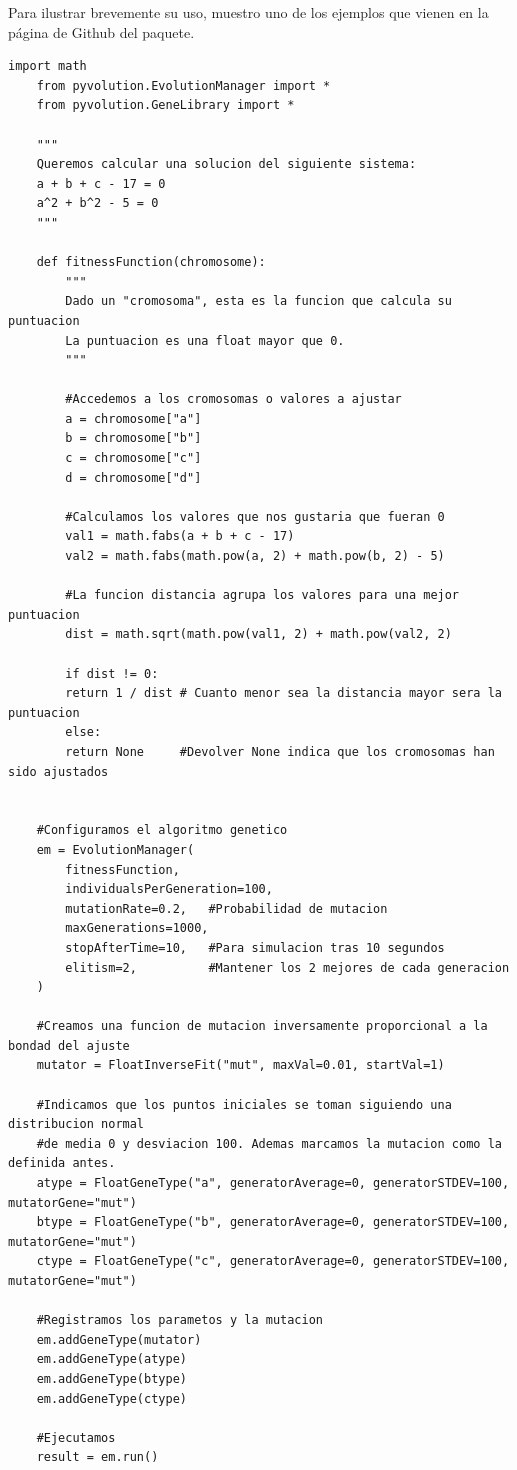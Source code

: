 \documentclass[12pt,a4paper]{article}
\begin{document}
		Para ilustrar brevemente su uso, muestro uno de los ejemplos que vienen en la p\'agina de Github del paquete.
		
		\begin{lstlisting}[basicstyle=\tiny]
	import math
	from pyvolution.EvolutionManager import *
	from pyvolution.GeneLibrary import *
	
	"""
	Queremos calcular una solucion del siguiente sistema:
	a + b + c - 17 = 0
	a^2 + b^2 - 5 = 0
	"""
		
	def fitnessFunction(chromosome):
		"""
		Dado un "cromosoma", esta es la funcion que calcula su puntuacion
		La puntuacion es una float mayor que 0.
		"""
		
		#Accedemos a los cromosomas o valores a ajustar
		a = chromosome["a"]
		b = chromosome["b"]
		c = chromosome["c"]
		d = chromosome["d"]
		
		#Calculamos los valores que nos gustaria que fueran 0
		val1 = math.fabs(a + b + c - 17)
		val2 = math.fabs(math.pow(a, 2) + math.pow(b, 2) - 5)
		
		#La funcion distancia agrupa los valores para una mejor puntuacion
		dist = math.sqrt(math.pow(val1, 2) + math.pow(val2, 2)
		
		if dist != 0:
		return 1 / dist # Cuanto menor sea la distancia mayor sera la puntuacion
		else:
		return None     #Devolver None indica que los cromosomas han sido ajustados
		
		
	#Configuramos el algoritmo genetico
	em = EvolutionManager(
		fitnessFunction,
		individualsPerGeneration=100,
		mutationRate=0.2,	#Probabilidad de mutacion
		maxGenerations=1000,
		stopAfterTime=10,   #Para simulacion tras 10 segundos
		elitism=2,          #Mantener los 2 mejores de cada generacion
	)
		
	#Creamos una funcion de mutacion inversamente proporcional a la bondad del ajuste
	mutator = FloatInverseFit("mut", maxVal=0.01, startVal=1)
		
	#Indicamos que los puntos iniciales se toman siguiendo una distribucion normal
	#de media 0 y desviacion 100. Ademas marcamos la mutacion como la definida antes.
	atype = FloatGeneType("a", generatorAverage=0, generatorSTDEV=100, mutatorGene="mut")
	btype = FloatGeneType("b", generatorAverage=0, generatorSTDEV=100, mutatorGene="mut")
	ctype = FloatGeneType("c", generatorAverage=0, generatorSTDEV=100, mutatorGene="mut")
		
	#Registramos los parametos y la mutacion
	em.addGeneType(mutator)
	em.addGeneType(atype)
	em.addGeneType(btype)
	em.addGeneType(ctype)
	
	#Ejecutamos	
	result = em.run()
		\end{lstlisting}
		
\end{document}
